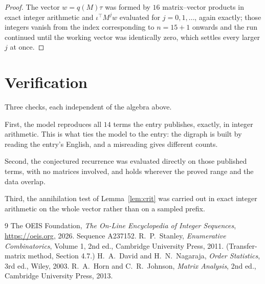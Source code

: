 \documentclass[11pt,a4paper]{article}
\theoremstyle{plain}
\theoremstyle{definition}
\begin{document}
\begin{proof}
The vector $w=q(M)\tau$ was formed by $16$ matrix--vector products in exact integer
arithmetic and $\iota^{\!\top}M^{j}w$ evaluated for $j=0,1,\dots$, again exactly; those
integers vanish from the index corresponding to $n=15+1$ onwards and the run continued
until the working vector was identically zero, which settles every larger $j$ at once.
\end{proof}

\section{Verification}

Three checks, each independent of the algebra above.

First, the model reproduces all $14$ terms the entry publishes, exactly, in integer
arithmetic. This is what ties the model to the entry: the digraph is built by reading the
entry's English, and a misreading gives different counts.

Second, the conjectured recurrence was evaluated directly on those published terms, with no
matrices involved, and holds wherever the proved range and the data overlap.

Third, the annihilation test of Lemma~\ref{lem:crit} was carried out in exact integer
arithmetic on the whole vector rather than on a sampled prefix.

\begin{thebibliography}{9}
 The OEIS Foundation, \emph{The On-Line Encyclopedia of Integer
Sequences}, \url{https://oeis.org}, 2026. Sequence A237152.
 R.~P.~Stanley, \emph{Enumerative Combinatorics}, Volume 1, 2nd ed.,
Cambridge University Press, 2011. (Transfer-matrix method, Section 4.7.)
 H.~A.~David and H.~N.~Nagaraja, \emph{Order Statistics}, 3rd ed., Wiley,
2003.
 R.~A.~Horn and C.~R.~Johnson, \emph{Matrix Analysis}, 2nd ed., Cambridge
University Press, 2013.
\end{thebibliography}
\end{document}
